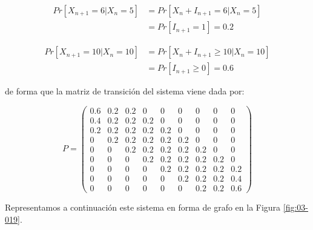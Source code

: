 \documentclass[
]{book}
\theoremstyle{definition}
\theoremstyle{definition}
\theoremstyle{definition}
\theoremstyle{definition}
\theoremstyle{remark}
\begin{document}
\[\begin{array}{ll}
Pr[X_{n+1} = 6 | X_n = 5] & = Pr[X_n + I_{n+1} = 6 | X_n = 5]\\
& = Pr[I_{n+1} = 1]  = 0.2
\end{array}\]

\[\begin{array}{ll}
Pr[X_{n+1} = 10 | X_n = 10] & = Pr[X_n + I_{n+1} \geq 10 | X_n = 10]\\
& = Pr[I_{n+1} \geq 0] = 0.6
\end{array}\]

de forma que la matriz de transición del sistema viene dada por:

\[P = 
\begin{pmatrix}
0.6 & 0.2 & 0.2 & 0 & 0 & 0 & 0 & 0 & 0\\
0.4 & 0.2 & 0.2 & 0.2 & 0 & 0 & 0 & 0 & 0\\
0.2 & 0.2 & 0.2 & 0.2 & 0.2 & 0 & 0 & 0 & 0\\
0 & 0.2 & 0.2 & 0.2 & 0.2 & 0.2 & 0 & 0 & 0\\
0 & 0 & 0.2 & 0.2 & 0.2 & 0.2 & 0.2 & 0 & 0\\
0 & 0 & 0 & 0.2 & 0.2 & 0.2 & 0.2 & 0.2 & 0\\
0 & 0 & 0 & 0 & 0.2 & 0.2 & 0.2 & 0.2 & 0.2\\
0 & 0 & 0 & 0 & 0 & 0.2 & 0.2 & 0.2 & 0.4\\
0 & 0 & 0 & 0 & 0 & 0 & 0.2 & 0.2 & 0.6
\end{pmatrix}\]

Representamos a continuación este sistema en forma de grafo en la Figura \ref{fig:03-019}.
\end{document}
